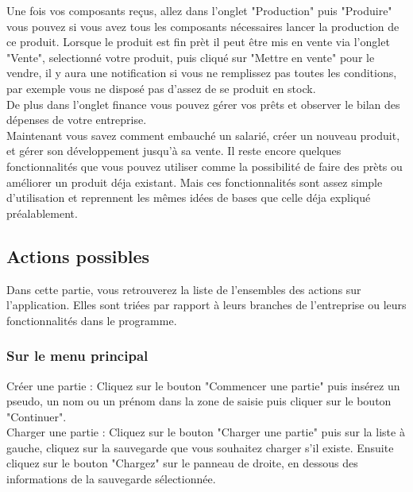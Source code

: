 Une fois vos composants reçus, allez dans l'onglet "Production" puis "Produire" vous pouvez si vous avez tous les composants nécessaires lancer la production de ce produit. Lorsque le produit est fin prèt il peut être mis en vente via l'onglet "Vente", selectionné votre produit, puis cliqué sur "Mettre en vente" pour le vendre, il y aura une notification si vous ne remplissez pas toutes les conditions, par exemple vous ne disposé pas d'assez de se produit en stock.\\

De plus dans l'onglet finance vous pouvez gérer vos prêts et observer le bilan des dépenses de votre entreprise.\\

Maintenant vous savez comment embauché un salarié, créer un nouveau produit, et gérer son développement jusqu'à sa vente. Il reste encore quelques fonctionnalités que vous pouvez utiliser comme la possibilité de faire des prèts ou améliorer un produit déja existant. Mais ces fonctionnalités sont assez simple d'utilisation et reprennent les mêmes idées de bases que celle déja expliqué préalablement.



\subsection{Actions possibles}



Dans cette partie, vous retrouverez la liste de l'ensembles des actions sur l'application. Elles sont triées par rapport à leurs branches de l'entreprise ou leurs fonctionnalités dans le programme.\\



\subsubsection*{Sur le menu principal}



Créer une partie : Cliquez sur le bouton "Commencer une partie" puis insérez un pseudo, un nom ou un prénom dans la zone de saisie puis cliquer sur le bouton "Continuer".\\

Charger une partie : Cliquez sur le bouton "Charger une partie" puis sur la liste à gauche, cliquez sur la sauvegarde que vous souhaitez charger s'il existe. Ensuite cliquez sur le bouton "Chargez" sur le panneau de droite, en dessous des informations de la sauvegarde sélectionnée.\\

